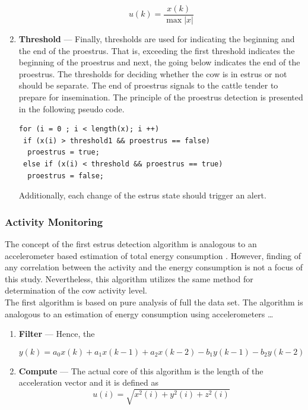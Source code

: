 \documentclass[english,12pt,a4paper,pdftex,elec,utf8]{aaltothesis}
\newcommand{\Clanguage}{\lstset{
  language=C++,                %
  basicstyle=\ttfamily,
  title=\lstname,                 %
}}
\begin{document}
\begin{enumerate}
\begin{equation}
u(k) = \frac{x(k)}{\max  \left| x \right|} 
\end{equation}


\item \textbf{Threshold} --- Finally, thresholds are used for indicating the beginning and the end of the proestrus. That is, exceeding the first threshold indicates the beginning of the proestrus and next, the going below indicates the end of the proestrus. The thresholds for deciding whether the cow is in estrus or not should be separate. The end of proestrus signals to the cattle tender to prepare for insemination. The principle of the proestrus detection is presented in the following pseudo code.  \\

\Clanguage
\begin{lstlisting}
for (i = 0 ; i < length(x); i ++)
 if (x(i) > threshold1 && proestrus == false)	
  proestrus = true;
 else if (x(i) < threshold && proestrus == true)
  proestrus = false;	
\end{lstlisting}
Additionally, each change of the estrus state should trigger an alert.


\end{enumerate}


\subsubsection{Activity Monitoring} \label{activitymeasurementsection}

The concept of the first estrus detection algorithm is analogous to an accelerometer based estimation of total energy consumption \cite{Kang2012}. However, finding of any correlation between the activity and the energy consumption is not a focus of this study. Nevertheless, this algorithm utilizes the same method for determination of the cow activity level. \\


The first algorithm is based on pure analysis of full the data set. The algorithm is analogous to an estimation of energy consumption using accelerometers   \dots \\



\begin{enumerate}
\item \textbf{Filter} --- Hence, the 

\begin{equation}
y(k) = a_0 x(k) + a_1 x(k-1) + a_2 x(k-2) - b_1 y(k-1) - b_2 y(k-2)
\end{equation}

\item \textbf{Compute} --- The actual core of this algorithm is the length of the acceleration vector and it is defined as \begin{equation}
u(i) = \sqrt{x^2(i) + y^2(i) + z^2(i)} 
\end{equation}

\end{enumerate}
\end{document}
